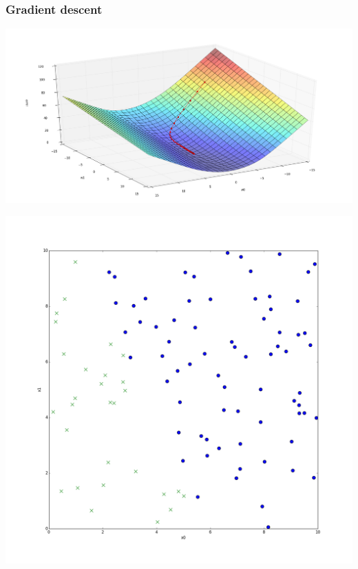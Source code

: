 \begin{frame}
  \frametitle{Gradient descent}
  \begin{center}
    \includegraphics[scale=0.22]{./pictures/gradient_descent.png}
  \end{center}
\end{frame}

\begin{frame}
  \begin{center}
    \includegraphics[scale=0.2]{./pictures/logreg_db000.png}
  \end{center}
\end{frame}

